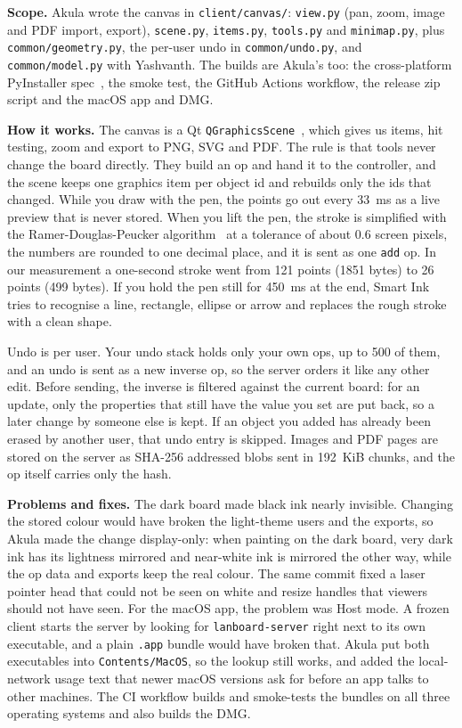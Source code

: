 \documentclass[11pt,a4paper]{article}
\newcommand{\file}[1]{\texttt{#1}}
\begin{document}
\textbf{Scope.} Akula wrote the canvas in \file{client/canvas/}: \file{view.py} (pan,
zoom, image and PDF import, export), \file{scene.py}, \file{items.py}, \file{tools.py} and
\file{minimap.py}, plus \file{common/geometry.py}, the per-user undo in
\file{common/undo.py}, and \file{common/model.py} with Yashvanth. The builds are Akula's too:
the cross-platform PyInstaller spec~\cite{pyinstaller}, the smoke test, the GitHub Actions
workflow, the release zip script and the macOS app and DMG.

\textbf{How it works.} The canvas is a Qt \file{QGraphicsScene}~\cite{qt}, which gives us items,
hit testing, zoom and export to PNG, SVG and PDF. The rule is that tools never change the board
directly. They build an op and hand it to the controller, and the scene keeps one graphics item
per object id and rebuilds only the ids that changed. While you draw with the pen, the points go
out every 33~ms as a live preview that is never stored. When you lift the pen, the stroke is
simplified with the Ramer-Douglas-Peucker algorithm~\cite{ramer,douglas} at a tolerance of about
0.6 screen pixels, the numbers are rounded to one decimal place, and it is sent as one
\texttt{add} op. In our measurement a one-second stroke went from 121 points (1851 bytes) to 26
points (499 bytes). If you hold the pen still for 450~ms at the end, Smart Ink tries to recognise
a line, rectangle, ellipse or arrow and replaces the rough stroke with a clean shape.

Undo is per user. Your undo stack holds only your own ops, up to 500 of them, and an undo is sent
as a new inverse op, so the server orders it like any other edit. Before sending, the inverse is
filtered against the current board: for an update, only the properties that still have the value
you set are put back, so a later change by someone else is kept. If an object you added has
already been erased by another user, that undo entry is skipped. Images and PDF pages are stored
on the server as SHA-256 addressed blobs sent in 192~KiB chunks, and the op itself carries only
the hash.

\textbf{Problems and fixes.} The dark board made black ink nearly invisible. Changing the stored
colour would have broken the light-theme users and the exports, so Akula made the change
display-only: when painting on the dark board, very dark ink has its lightness mirrored and
near-white ink is mirrored the other way, while the op data and exports keep the real colour. The
same commit fixed a laser pointer head that could not be seen on white and resize handles that
viewers should not have seen. For the macOS app, the problem was Host mode. A frozen client
starts the server by looking for \file{lanboard-server} right next to its own executable, and a
plain \file{.app} bundle would have broken that. Akula put both executables into
\file{Contents/MacOS}, so the lookup still works, and added the local-network usage text that
newer macOS versions ask for before an app talks to other machines. The CI workflow builds and smoke-tests the
bundles on all three operating systems and also builds the DMG.
\end{document}
